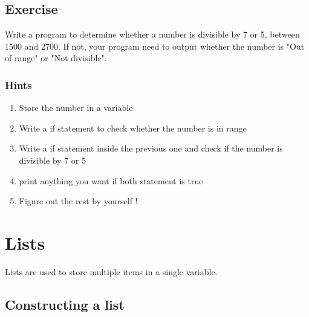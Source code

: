 \documentclass[12pt]{article}
\begin{document}
\begin{CJK*}{UTF8}{bkai}
\subsection{Exercise}
Write a program to determine whether a number is divisible by 7 or 5, between 1500 and 2700. If not, your program need to output whether the number is "Out of range" or "Not divisible".
\subsubsection{Hints}
\begin{enumerate}
    \item Store the number in a variable
    \item Write a if statement to check whether the number is in range
    \item Write a if statement inside the previous one and check if the number is divisible by 7 or 5
    \item print anything you want if both statement is true
    \item Figure out the rest by yourself !
\end{enumerate}

\section{Lists}
Lists are used to store multiple items in a single variable. \\
\subsection{Constructing a list}



\end{CJK*}
\end{document}

